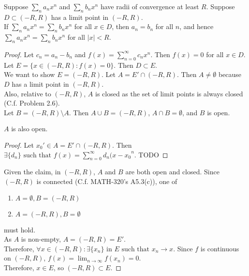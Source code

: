 \begin{thm}
	Suppose $\sum_{n}{a_{n}x^{n}}$ and $\sum_{n}{b_{n}x^{n}}$ have radii of convergence at least  $R$. Suppose $D \subset (-R,R)$ has a limit point in $(-R,R)$.\\
	If $\sum_{n}{a_{n}x^{n}}=\sum_{n}{b_{n}x^{n}}$ for all $x \in D$, then $a_{n}=b_{n}$ for all $n$, and hence $\sum_{n}{a_{n}x^{n}}=\sum_{n}{b_{n}x^{n}}$ for all $\left|x\right|<R$.
	\begin{proof}
		Let $c_{n}=a_{n}-b_{n}$ and $f(x)=\sum_{n=0}^{\infty}{c_n x^{n}}$.
		Then $f(x)=0$ for all $x \in D$.\\
		Let $E=\{x \in (-R,R): f(x)=0\}$. Then $D \subset E$.\\
		We want to show $E=(-R,R)$.
		Let $A=E' \cap (-R,R)$. Then $A\neq \emptyset$ because $D$ has a limit point in $(-R,R)$.\\
		Also, relative to $(-R,R)$, $A$ is closed as the set of limit points is always closed (C.f. Problem 2.6).\\
		Let $B=(-R,R)\setminus A$. Then $A\cup B=(-R,R)$, $A\cap B=\emptyset$, and $B$ is open.\\
		\begin{claim}
			$A$ is also open.
			\begin{proof}
				Let $x_{0}' \in A=E' \cap (-R,R)$.
				Then $\exists{\{ {d}_{n}\}} \text{ such that } f(x)=\sum_{n=0}^{\infty}{d_n (x-x_{0}}^{n}$.
				TODO
			\end{proof}
		\end{claim}
		Given the claim, in $(-R,R)$, $A$ and $B$ are both open and closed.
		Since $(-R,R)$ is connected (C.f. MATH-320's A5.3(c)),
		one of \begin{enumerate}
			\item $A=\emptyset,B=(-R,R)$
			\item $A=(-R,R),B=\emptyset$
		\end{enumerate}
		must hold.\\
		As $A$ is non-empty, $A=(-R,R)=E'$.\\
		Therefore, $\forall{x \in (-R,R)}: \exists{\{ {x}_{n}\} \text{ in } E} \text{ such that } x_n\to x$.
		Since $f$ is continuous on $(-R,R)$, $f(x)=\lim_{n\to \infty}{f(x_n)}=0$.\\
		Therefore, $x \in E$, so $(-R,R)\subset E$.
	\end{proof}
\end{thm}

